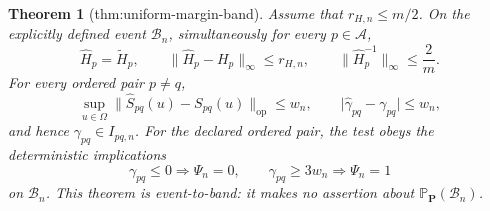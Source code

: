 \documentclass{article}
\newtheorem{theorem}{Theorem}
\begin{document}
\begin{theorem}[thm:uniform-margin-band]\label{thm:uniform-margin-band}
Assume that \(r_{H,n}\le m/2\).  On the explicitly defined event
\(\mathcal B_n\), simultaneously for every \(p\in\mathcal A\),
\[
 \widehat H_p=\widetilde H_p,
 \qquad
 \lVert\widehat H_p-H_p\rVert_\infty\le r_{H,n},
 \qquad
 \lVert\widehat H_p^{-1}\rVert_\infty\le \frac{2}{m}.
\]
For every ordered pair \(p\ne q\),
\[
 \sup_{u\in\Omega}
 \lVert\widehat S_{pq}(u)-S_{pq}(u)\rVert_{\mathrm{op}}
 \le w_n,
 \qquad
 \lvert\widehat\gamma_{pq}-\gamma_{pq}\rvert\le w_n,
\]
and hence \(\gamma_{pq}\in I_{pq,n}\).  For the declared ordered pair, the test obeys the deterministic implications
\[
 \gamma_{pq}\le0\Longrightarrow\Psi_n=0,
 \qquad
 \gamma_{pq}\ge3w_n\Longrightarrow\Psi_n=1
\]
on \(\mathcal B_n\).  This theorem is event-to-band: it makes no assertion about \(\mathbb P_{\mathbf P}(\mathcal B_n)\).
\end{theorem}
\end{document}
